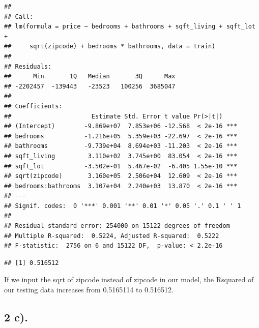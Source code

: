 \documentclass[
]{article}
\newenvironment{Shaded}{\begin{snugshade}}{\end{snugshade}}
\newcommand{\DecValTok}[1]{\textcolor[rgb]{0.00,0.00,0.81}{#1}}
\newcommand{\KeywordTok}[1]{\textcolor[rgb]{0.13,0.29,0.53}{\textbf{#1}}}
\newcommand{\NormalTok}[1]{#1}
\newcommand{\OperatorTok}[1]{\textcolor[rgb]{0.81,0.36,0.00}{\textbf{#1}}}
\newcommand{\StringTok}[1]{\textcolor[rgb]{0.31,0.60,0.02}{#1}}
\begin{document}
\begin{verbatim}
## 
## Call:
## lm(formula = price ~ bedrooms + bathrooms + sqft_living + sqft_lot + 
##     sqrt(zipcode) + bedrooms * bathrooms, data = train)
## 
## Residuals:
##      Min       1Q   Median       3Q      Max 
## -2202457  -139443   -23523   100256  3685047 
## 
## Coefficients:
##                      Estimate Std. Error t value Pr(>|t|)    
## (Intercept)        -9.869e+07  7.853e+06 -12.568  < 2e-16 ***
## bedrooms           -1.216e+05  5.359e+03 -22.697  < 2e-16 ***
## bathrooms          -9.739e+04  8.694e+03 -11.203  < 2e-16 ***
## sqft_living         3.110e+02  3.745e+00  83.054  < 2e-16 ***
## sqft_lot           -3.502e-01  5.467e-02  -6.405 1.55e-10 ***
## sqrt(zipcode)       3.160e+05  2.506e+04  12.609  < 2e-16 ***
## bedrooms:bathrooms  3.107e+04  2.240e+03  13.870  < 2e-16 ***
## ---
## Signif. codes:  0 '***' 0.001 '**' 0.01 '*' 0.05 '.' 0.1 ' ' 1
## 
## Residual standard error: 254000 on 15122 degrees of freedom
## Multiple R-squared:  0.5224, Adjusted R-squared:  0.5222 
## F-statistic:  2756 on 6 and 15122 DF,  p-value: < 2.2e-16
\end{verbatim}

\begin{Shaded}
\end{Shaded}

\begin{verbatim}
## [1] 0.516512
\end{verbatim}

If we input the sqrt of zipcode instead of zipcode in our model, the
Rsquared of our testing data increases from 0.5165114 to 0.516512.

\hypertarget{c.-1}{%
\subsection{2 c).}\label{c.-1}}
\end{document}
